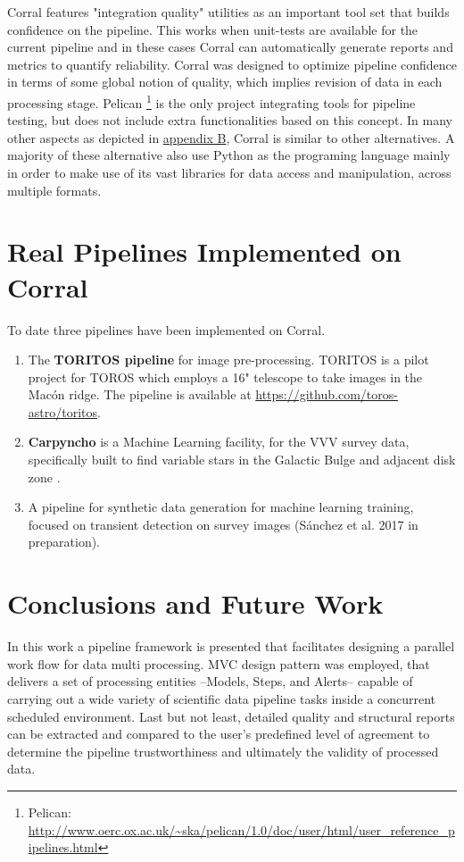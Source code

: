 \documentclass[final,5p,times,twocolumn,authoryear]{elsarticle}
\begin{document}
Corral features "integration quality" utilities as
an important tool set that builds confidence on the pipeline.
%
This works when unit-tests are available for the current
pipeline and in these cases Corral can automatically generate
reports and metrics to quantify reliability.
%
Corral was designed to optimize pipeline confidence in terms of
some global notion of quality, which implies revision of data in each
processing stage.
%
Pelican \footnote{Pelican:
\url{http://www.oerc.ox.ac.uk/~ska/pelican/1.0/doc/user/html/user_reference_pipelines.html}}
is the only project integrating tools for pipeline testing, but does not include
extra functionalities based on this concept.
%
In many other aspects as depicted in \hyperref[appendixb]{appendix B},
Corral is similar to other alternatives. A majority of these alternative also use Python
as the programing language mainly in order to make use of
its vast libraries for data access and manipulation, across multiple formats.

%
\section{Real Pipelines Implemented on Corral}
\label{section:real_pipelines}
To date three pipelines have been implemented on Corral.
\begin{enumerate}
\item The \textbf{TORITOS pipeline} for image pre-processing.
TORITOS is a pilot project
for TOROS which employs a 16" telescope to take images in
the Mac\'on ridge. The pipeline is available at
\url{https://github.com/toros-astro/toritos}.
\item \textbf{Carpyncho} is a Machine Learning facility, for the VVV
\citep{minniti2010vista} survey data,
specifically built to find variable stars in the Galactic Bulge and adjacent disk zone
\citep{cabral2016generacion}.
\item A pipeline for synthetic data generation for
machine learning training, focused on transient detection on survey images
(S\'anchez et al. 2017 in preparation).
\end{enumerate}
%
%
\section{Conclusions and Future Work}\label{section:conclusions}
In this work a pipeline framework is presented that facilitates designing a parallel work flow for data multi processing.
%
MVC design pattern was employed, that delivers a set of processing entities --Models, Steps, and Alerts-- capable of carrying out a wide variety of scientific data pipeline tasks inside a concurrent scheduled environment.
%
Last but not least, detailed quality and structural
reports can be extracted and compared to the user's
predefined level of agreement to determine the pipeline
trustworthiness and ultimately the validity of processed data.
\end{document}

